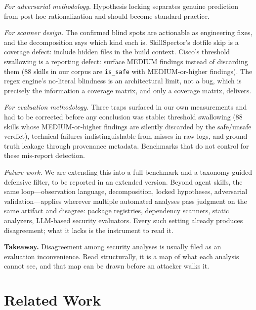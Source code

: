 \documentclass[sigconf,nonacm]{acmart}
\begin{document}
\emph{For adversarial methodology.} Hypothesis locking separates genuine prediction from post-hoc rationalization and should become standard practice.

\emph{For scanner design.} The confirmed blind spots are actionable as engineering fixes, and the decomposition says which kind each is. SkillSpector's dotfile skip is a coverage defect: include hidden files in the build context. Cisco's threshold swallowing is a reporting defect: surface MEDIUM findings instead of discarding them (88 skills in our corpus are \texttt{is\_safe} with MEDIUM-or-higher findings). The regex engine's no-literal blindness is an architectural limit, not a bug, which is precisely the information a coverage matrix, and only a coverage matrix, delivers.

\emph{For evaluation methodology.} Three traps surfaced in our own measurements and had to be corrected before any conclusion was stable: threshold swallowing (88 skills whose MEDIUM-or-higher findings are silently discarded by the safe/unsafe verdict), technical failures indistinguishable from misses in raw logs, and ground-truth leakage through provenance metadata. Benchmarks that do not control for these mis-report detection.

\emph{Future work.} We are extending this into a full benchmark and a taxonomy-guided defensive filter, to be reported in an extended version. Beyond agent skills, the same loop---observation language, decomposition, locked hypotheses, adversarial validation---applies wherever multiple automated analyses pass judgment on the same artifact and disagree: package registries, dependency scanners, static analyzers, LLM-based security evaluators. Every such setting already produces disagreement; what it lacks is the instrument to read it.

\medskip
\noindent\textbf{Takeaway.} Disagreement among security analyses is usually filed as an evaluation inconvenience. Read structurally, it is a map of what each analysis cannot see, and that map can be drawn before an attacker walks it.

\section{Related Work}
\label{sec:related}
\end{document}
